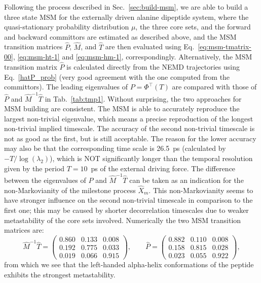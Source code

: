 \documentclass[journal=jctcce,manuscript=article]{achemso}
\newcommand{\myphi}{\Phi}
\begin{document}
Following the process described in Sec.~\ref{sec:build-msm}, we are able to build a 
three state MSM for the externally driven alanine dipeptide system,
where the quasi-stationary probability distribution $\mu$, the three core sets, and the forward and backward committors are
estimated as described above, and the MSM transition matrices $\hat P$, $\hat{M}$, and $\hat{T}$ are then evaluated using Eq.~\eqref{eq:msm-tmatrix-00}, \eqref{eq:msm-ht-1} and \eqref{eq:msm-hm-1}, correspondingly.
Alternatively, the MSM  transition matrix $\hat P$ is calculated directly from the NEMD trajectories using Eq.~\eqref{hatP_prob} (very good agreement with the one computed from the committors).
The leading eigenvalues of $P=\myphi^{\top}(T)$ are compared with those of $\hat P$ and $\hat{M}^{-1}\hat{T}$ in
Tab.~\ref{tab:tmp1}.
Without surprising, the two approaches for MSM building are consistent.
The MSM is able to accurately reproduce
the largest non-trivial eigenvalue, which means a precise reproduction
of the longest non-trivial implied timescale. The accuracy of the second non-trivial
timescale is not as good as the first, but is still acceptable.
The reason
for the lower accuracy may also be that
the corresponding time scale is 26.5~ps (calculated by $-T/\log(\lambda_2)$),
which is NOT significantly longer than the temporal resolution given by the period $T=10$~ps of the external driving force.
The difference between the eigenvalues of $\hat P$ and $\hat{M}^{-1}\hat T$
  can be taken as an indication for the non-Markovianity of the milestone process $\hat X_m$. This
  non-Markovianity seems to have stronger influence on the second non-trivial timescale in comparison to the first one; this may be caused by shorter decorrelation timescales due to weaker metastability of the core sets involved.
Numerically the two MSM transition matrices are:
\[
\hat{M}^{-1}\hat{T}=\left(\begin{array}{ccc}
   0.860 &   0.133 &   0.008 \\
    0.192  &  0.775  &  0.033\\
    0.019   & 0.066 &   0.915
\end{array}
\right),\qquad \hat{P}=\left(\begin{array}{ccc}
   0.882 &   0.110 &   0.008 \\
    0.158  &  0.815  &  0.028\\
    0.023   & 0.055 &   0.922
\end{array}
\right),
\]
from which we see that  the left-handed alpha-helix conformations of the peptide exhibits the strongest metastability. 
\end{document}
